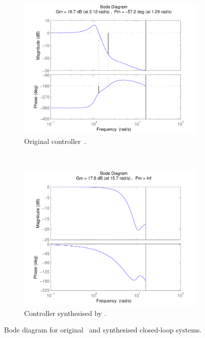 \documentclass{sig-alternate-05-2015}
\begin{document}
%
\begin{figure}[H]
    \centering
    \begin{subfigure}[b]{0.4\textwidth}
        \includegraphics[width=\textwidth]{figures/runningexample_bd0.pdf}
        \caption{Original controller~\cite{DBLP:conf/hybrid/WangGRJF16}.}
        \label{fig:original}
    \end{subfigure}
    ~
    \begin{subfigure}[b]{0.4\textwidth}
        \includegraphics[width=\textwidth]{figures/runningexample_bd2.pdf}
        \caption{Controller synthesised by \tool.}
        \label{fig:cegiscontroller}
    \end{subfigure}
    \caption{Bode diagram for original~\cite{DBLP:conf/hybrid/WangGRJF16} and synthesised closed-loop systems.}\label{fig:bode}
\end{figure}
\end{document}

